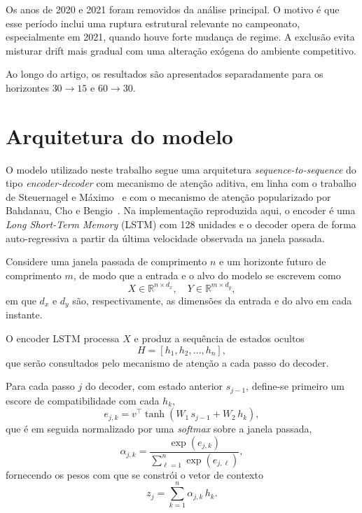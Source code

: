 \documentclass[runningheads]{llncs}
\begin{document}
Os anos de 2020 e 2021 foram removidos da an\'alise principal. O motivo \'e que esse per\'iodo inclui uma ruptura estrutural relevante no campeonato, especialmente em 2021, quando houve forte mudan\c{c}a de regime. A exclus\~ao evita misturar drift mais gradual com uma altera\c{c}\~ao ex\'ogena do ambiente competitivo.

Ao longo do artigo, os resultados s\~ao apresentados separadamente para os horizontes \(30 \rightarrow 15\) e \(60 \rightarrow 30\).

\section{Arquitetura do modelo}

O modelo utilizado neste trabalho segue uma arquitetura \textit{sequence-to-sequence} do tipo \textit{encoder-decoder} com mecanismo de aten\c{c}\~ao aditiva, em linha com o trabalho de Steuernagel e M\'aximo~\cite{seq2seq} e com o mecanismo de aten\c{c}\~ao popularizado por Bahdanau, Cho e Bengio~\cite{bahdanau}. Na implementa\c{c}\~ao reproduzida aqui, o encoder \'e uma \textit{Long Short-Term Memory} (LSTM) com 128 unidades e o decoder opera de forma auto-regressiva a partir da \'ultima velocidade observada na janela passada.

Considere uma janela passada de comprimento \(n\) e um horizonte futuro de comprimento \(m\), de modo que a entrada e o alvo do modelo se escrevem como
\begin{equation}\label{eq:xy}
X \in \mathbb{R}^{n \times d_x}, \quad Y \in \mathbb{R}^{m \times d_y},
\end{equation}
em que \(d_x\) e \(d_y\) s\~ao, respectivamente, as dimens\~oes da entrada e do alvo em cada instante.

O encoder LSTM processa \(X\) e produz a sequ\^encia de estados ocultos
\begin{equation}\label{eq:enc}
H = [h_1, h_2, \dots, h_n],
\end{equation}
que ser\~ao consultados pelo mecanismo de aten\c{c}\~ao a cada passo do decoder.

Para cada passo \(j\) do decoder, com estado anterior \(s_{j-1}\), define-se primeiro um escore de compatibilidade com cada \(h_k\),
\begin{equation}\label{eq:attn_score}
e_{j,k} = v^{\top} \tanh(W_1\, s_{j-1} + W_2\, h_k),
\end{equation}
que \'e em seguida normalizado por uma \textit{softmax} sobre a janela passada,
\begin{equation}\label{eq:attn_alpha}
\alpha_{j,k} = \frac{\exp(e_{j,k})}{\sum_{\ell=1}^{n} \exp(e_{j,\ell})},
\end{equation}
fornecendo os pesos com que se constr\'oi o vetor de contexto
\begin{equation}\label{eq:attn_ctx}
z_j = \sum_{k=1}^{n} \alpha_{j,k}\, h_k.
\end{equation}
\end{document}
